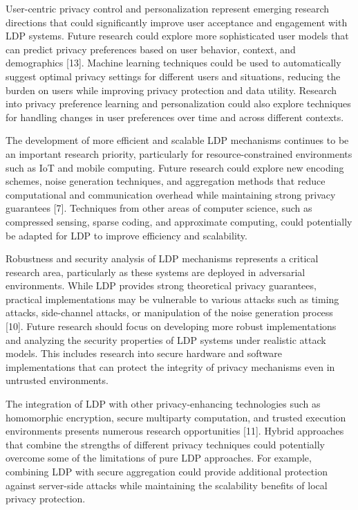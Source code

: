 \documentclass[conference]{IEEEtran}
\begin{document}
User-centric privacy control and personalization represent emerging research directions that could significantly improve user acceptance and engagement with LDP systems. Future research could explore more sophisticated user models that can predict privacy preferences based on user behavior, context, and demographics [13]. Machine learning techniques could be used to automatically suggest optimal privacy settings for different users and situations, reducing the burden on users while improving privacy protection and data utility. Research into privacy preference learning and personalization could also explore techniques for handling changes in user preferences over time and across different contexts.

The development of more efficient and scalable LDP mechanisms continues to be an important research priority, particularly for resource-constrained environments such as IoT and mobile computing. Future research could explore new encoding schemes, noise generation techniques, and aggregation methods that reduce computational and communication overhead while maintaining strong privacy guarantees [7]. Techniques from other areas of computer science, such as compressed sensing, sparse coding, and approximate computing, could potentially be adapted for LDP to improve efficiency and scalability.

Robustness and security analysis of LDP mechanisms represents a critical research area, particularly as these systems are deployed in adversarial environments. While LDP provides strong theoretical privacy guarantees, practical implementations may be vulnerable to various attacks such as timing attacks, side-channel attacks, or manipulation of the noise generation process [10]. Future research should focus on developing more robust implementations and analyzing the security properties of LDP systems under realistic attack models. This includes research into secure hardware and software implementations that can protect the integrity of privacy mechanisms even in untrusted environments.

The integration of LDP with other privacy-enhancing technologies such as homomorphic encryption, secure multiparty computation, and trusted execution environments presents numerous research opportunities [11]. Hybrid approaches that combine the strengths of different privacy techniques could potentially overcome some of the limitations of pure LDP approaches. For example, combining LDP with secure aggregation could provide additional protection against server-side attacks while maintaining the scalability benefits of local privacy protection.
\end{document}
